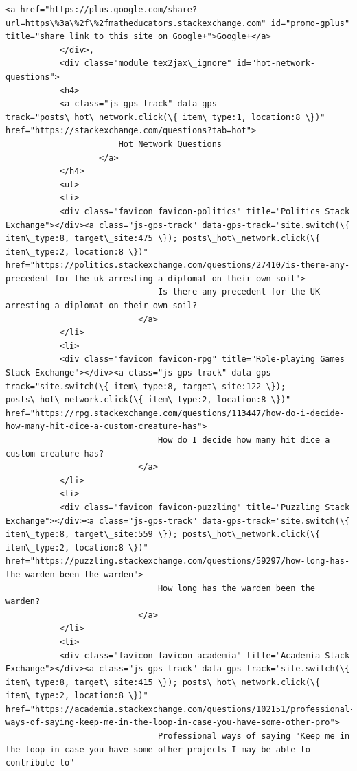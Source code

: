 \documentclass[11pt]{article}
\begin{document}
\begin{Verbatim}[commandchars=\\\{\}]
           <a href="https://plus.google.com/share?url=https\%3a\%2f\%2fmatheducators.stackexchange.com" id="promo-gplus" title="share link to this site on Google+">Google+</a>
           </div>,
           <div class="module tex2jax\_ignore" id="hot-network-questions">
           <h4>
           <a class="js-gps-track" data-gps-track="posts\_hot\_network.click(\{ item\_type:1, location:8 \})" href="https://stackexchange.com/questions?tab=hot">
                       Hot Network Questions
                   </a>
           </h4>
           <ul>
           <li>
           <div class="favicon favicon-politics" title="Politics Stack Exchange"></div><a class="js-gps-track" data-gps-track="site.switch(\{ item\_type:8, target\_site:475 \}); posts\_hot\_network.click(\{ item\_type:2, location:8 \})" href="https://politics.stackexchange.com/questions/27410/is-there-any-precedent-for-the-uk-arresting-a-diplomat-on-their-own-soil">
                               Is there any precedent for the UK arresting a diplomat on their own soil?
                           </a>
           </li>
           <li>
           <div class="favicon favicon-rpg" title="Role-playing Games Stack Exchange"></div><a class="js-gps-track" data-gps-track="site.switch(\{ item\_type:8, target\_site:122 \}); posts\_hot\_network.click(\{ item\_type:2, location:8 \})" href="https://rpg.stackexchange.com/questions/113447/how-do-i-decide-how-many-hit-dice-a-custom-creature-has">
                               How do I decide how many hit dice a custom creature has?
                           </a>
           </li>
           <li>
           <div class="favicon favicon-puzzling" title="Puzzling Stack Exchange"></div><a class="js-gps-track" data-gps-track="site.switch(\{ item\_type:8, target\_site:559 \}); posts\_hot\_network.click(\{ item\_type:2, location:8 \})" href="https://puzzling.stackexchange.com/questions/59297/how-long-has-the-warden-been-the-warden">
                               How long has the warden been the warden?
                           </a>
           </li>
           <li>
           <div class="favicon favicon-academia" title="Academia Stack Exchange"></div><a class="js-gps-track" data-gps-track="site.switch(\{ item\_type:8, target\_site:415 \}); posts\_hot\_network.click(\{ item\_type:2, location:8 \})" href="https://academia.stackexchange.com/questions/102151/professional-ways-of-saying-keep-me-in-the-loop-in-case-you-have-some-other-pro">
                               Professional ways of saying "Keep me in the loop in case you have some other projects I may be able to contribute to"

\end{Verbatim}
\end{document}
